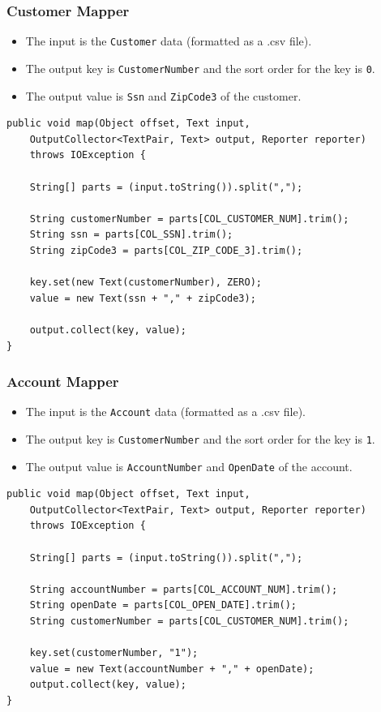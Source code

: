 \subsubsection{Customer Mapper}
  \begin{itemize}
  \item The input is the \texttt{Customer} data (formatted as a .csv file). 
  \item The output key is \texttt{CustomerNumber} and the sort order for the key is \texttt{0}.
  \item The output value is \texttt{Ssn} and \texttt{ZipCode3} of the customer.
  \end{itemize}
{
\singlespace
\small
\begin{verbatim}
public void map(Object offset, Text input, 
    OutputCollector<TextPair, Text> output, Reporter reporter) 
    throws IOException {
    
    String[] parts = (input.toString()).split(",");

    String customerNumber = parts[COL_CUSTOMER_NUM].trim();
    String ssn = parts[COL_SSN].trim();
    String zipCode3 = parts[COL_ZIP_CODE_3].trim();

    key.set(new Text(customerNumber), ZERO);
    value = new Text(ssn + "," + zipCode3);

    output.collect(key, value);
}
\end{verbatim}
}
\subsubsection{Account Mapper}
  \begin{itemize}
  \item The input is the \texttt{Account} data (formatted as a .csv file).
  \item The output key is \texttt{CustomerNumber} and the sort order for the key is \texttt{1}.
  \item The output value is \texttt{AccountNumber} and \texttt{OpenDate} of the account.
  \end{itemize}
{
\singlespace
\small
\begin{verbatim}
public void map(Object offset, Text input,
    OutputCollector<TextPair, Text> output, Reporter reporter) 
    throws IOException {

    String[] parts = (input.toString()).split(",");

    String accountNumber = parts[COL_ACCOUNT_NUM].trim();
    String openDate = parts[COL_OPEN_DATE].trim();
    String customerNumber = parts[COL_CUSTOMER_NUM].trim();

    key.set(customerNumber, "1");
    value = new Text(accountNumber + "," + openDate);
    output.collect(key, value);
}
\end{verbatim}
}
